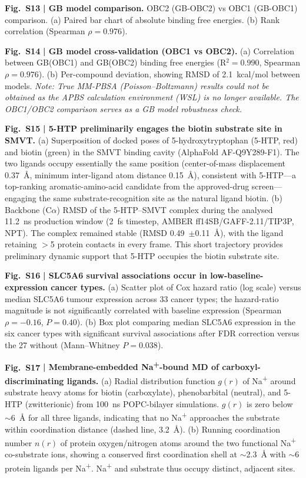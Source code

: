 \documentclass[10pt,letterpaper]{article}
\begin{document}
\noindent\textbf{Fig.~S13} \textbf{| GB model comparison.} OBC2 (GB-OBC2) vs OBC1 (GB-OBC1) comparison. (a) Paired bar chart of absolute binding free energies. (b) Rank correlation (Spearman $\rho = 0.976$).

\noindent\textbf{Fig.~S14} \textbf{| GB model cross-validation (OBC1 vs OBC2).} (a) Correlation between GB(OBC1) and GB(OBC2) binding free energies (R$^2 = 0.990$, Spearman $\rho = 0.976$). (b) Per-compound deviation, showing RMSD of 2.1~kcal/mol between models. \textit{Note: True MM-PBSA (Poisson--Boltzmann) results could not be obtained as the APBS calculation environment (WSL) is no longer available. The OBC1/OBC2 comparison serves as a GB model robustness check.}

\noindent\textbf{Fig.~S15} \textbf{| 5-HTP preliminarily engages the biotin substrate site in SMVT.} (a) Superposition of docked poses of 5-hydroxytryptophan (5-HTP, red) and biotin (green) in the SMVT binding cavity (AlphaFold AF-Q9Y289-F1). The two ligands occupy essentially the same position (center-of-mass displacement 0.37~\AA{}, minimum inter-ligand atom distance 0.15~\AA{}), consistent with 5-HTP---a top-ranking aromatic-amino-acid candidate from the approved-drug screen---engaging the same substrate-recognition site as the natural ligand biotin. (b) Backbone (C$\alpha$) RMSD of the 5-HTP--SMVT complex during the analysed 11.2~ns production window (2~fs timestep, AMBER ff14SB/GAFF-2.11/TIP3P, NPT). The complex remained stable (RMSD 0.49~$\pm$0.11~\AA{}), with the ligand retaining $>$5 protein contacts in every frame. This short trajectory provides preliminary dynamic support that 5-HTP occupies the biotin substrate site.

\noindent\textbf{Fig.~S16} \textbf{| SLC5A6 survival associations occur in low-baseline-expression cancer types.} (a) Scatter plot of Cox hazard ratio (log scale) versus median SLC5A6 tumour expression across 33 cancer types; the hazard-ratio magnitude is not significantly correlated with baseline expression (Spearman $\rho=-0.16$, $P=0.40$). (b) Box plot comparing median SLC5A6 expression in the six cancer types with significant survival associations after FDR correction versus the 27 without (Mann--Whitney $P=0.038$).

\noindent\textbf{Fig.~S17} \textbf{| Membrane-embedded Na\textsuperscript{+}-bound MD of carboxyl-discriminating ligands.} (a) Radial distribution function $g(r)$ of Na\textsuperscript{+} around substrate heavy atoms for biotin (carboxylate), phenobarbital (neutral), and 5-HTP (zwitterionic) from 100~ns POPC-bilayer simulations. $g(r)$ is zero below $\sim$6~\AA{} for all three ligands, indicating that no Na\textsuperscript{+} approaches the substrate within coordination distance (dashed line, 3.2~\AA{}). (b) Running coordination number $n(r)$ of protein oxygen/nitrogen atoms around the two functional Na\textsuperscript{+} co-substrate ions, showing a conserved first coordination shell at $\sim$2.3~\AA{} with $\sim$6 protein ligands per Na\textsuperscript{+}. Na\textsuperscript{+} and substrate thus occupy distinct, adjacent sites.
\end{document}
